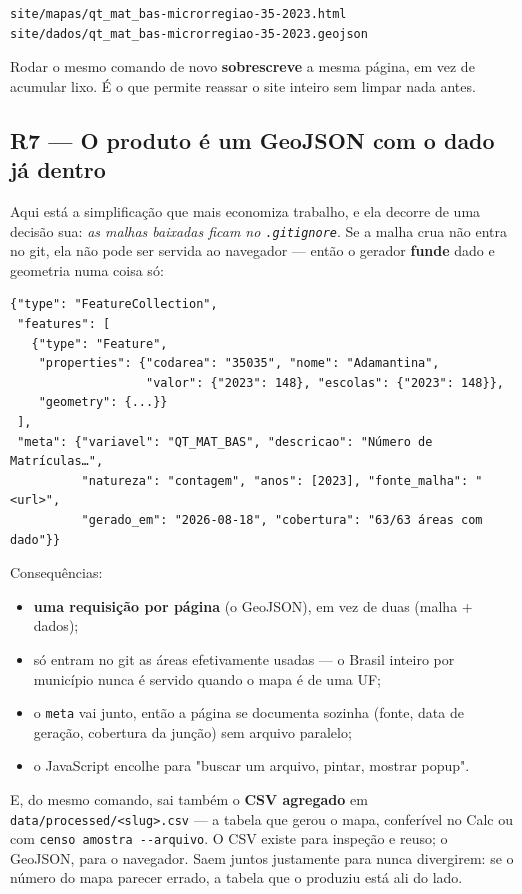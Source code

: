 \documentclass[11pt]{article}
\begin{document}
\begin{verbatim}
site/mapas/qt_mat_bas-microrregiao-35-2023.html
site/dados/qt_mat_bas-microrregiao-35-2023.geojson
\end{verbatim}

Rodar o mesmo comando de novo \textbf{sobrescreve} a mesma página, em vez de
acumular lixo. É o que permite reassar o site inteiro sem limpar nada antes.
\subsection{R7 — O produto é um GeoJSON com o dado já dentro}
\label{sec:org61c9b3c}

Aqui está a simplificação que mais economiza trabalho, e ela decorre de uma
decisão sua: \emph{as malhas baixadas ficam no \texttt{.gitignore}}. Se a malha crua não
entra no git, ela não pode ser servida ao navegador — então o gerador
\textbf{funde} dado e geometria numa coisa só:

\begin{verbatim}
{"type": "FeatureCollection",
 "features": [
   {"type": "Feature",
    "properties": {"codarea": "35035", "nome": "Adamantina",
                   "valor": {"2023": 148}, "escolas": {"2023": 148}},
    "geometry": {...}}
 ],
 "meta": {"variavel": "QT_MAT_BAS", "descricao": "Número de Matrículas…",
          "natureza": "contagem", "anos": [2023], "fonte_malha": "<url>",
          "gerado_em": "2026-08-18", "cobertura": "63/63 áreas com dado"}}
\end{verbatim}

Consequências:

\begin{itemize}
\item \textbf{uma requisição por página} (o GeoJSON), em vez de duas (malha + dados);
\item só entram no git as áreas efetivamente usadas — o Brasil inteiro por
município nunca é servido quando o mapa é de uma UF;
\item o \texttt{meta} vai junto, então a página se documenta sozinha (fonte, data de
geração, cobertura da junção) sem arquivo paralelo;
\item o JavaScript encolhe para "buscar um arquivo, pintar, mostrar popup".
\end{itemize}

E, do mesmo comando, sai também o \textbf{CSV agregado} em
\texttt{data/processed/<slug>.csv} — a tabela que gerou o mapa, conferível no Calc
ou com \texttt{censo amostra -{}-{}arquivo}. O CSV existe para inspeção e reuso; o
GeoJSON, para o navegador. Saem juntos justamente para nunca divergirem: se
o número do mapa parecer errado, a tabela que o produziu está ali do lado.
\end{document}
